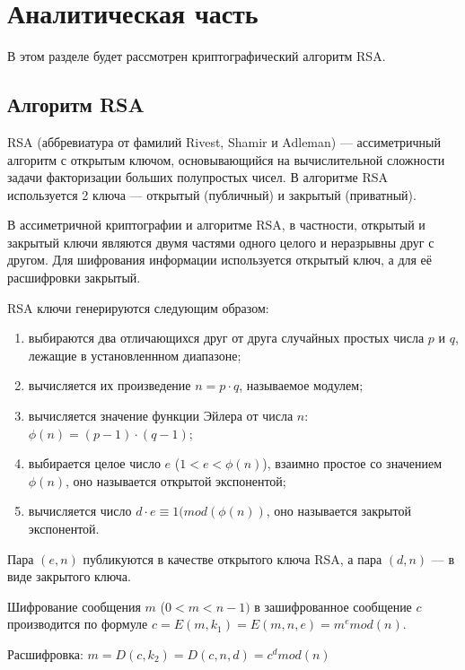 \chapter{Аналитическая часть}

В этом разделе будет рассмотрен криптографический алгоритм RSA.

\section{Алгоритм RSA}

RSA (аббревиатура от фамилий Rivest, Shamir и Adleman) --- ассиметричный алгоритм с открытым ключом, основывающийся на вычислительной сложности задачи факторизации больших полупростых чисел. В алгоритме RSA используется 2 ключа --- открытый (публичный) и закрытый (приватный).

В ассиметричной криптографии и алгоритме RSA, в частности, открытый и закрытый ключи являются двумя частями одного целого и неразрывны друг с другом. Для шифрования информации используется открытый ключ, а для её расшифровки закрытый.


RSA ключи генерируются следующим образом:
\begin{enumerate}[label=\arabic*)]
	\item выбираются два отличающихся друг от друга случайных простых числа $p$ и $q$, лежащие в установленнном диапазоне;
	\item вычисляется их произведение $n = p \cdot q$, называемое модулем;
	\item вычисляется значение функции Эйлера от числа $n$: $\phi(n) = (p - 1)\cdot (q - 1)$;
	\item выбирается целое число $e$ ($1 < e < \phi(n)$), взаимно простое со значением $\phi(n)$, оно называется открытой экспонентой;
	\item вычисляется число $d \cdot e  \equiv 1 (mod (\phi(n))$, оно называется закрытой экспонентой.
\end{enumerate}

Пара $(e, n)$ публикуются в качестве открытого ключа RSA, а пара $(d, n)$ --- в виде закрытого ключа.


Шифрование сообщения $m$ ($0 < m < n - 1)$ в зашифрованное сообщение $c$ производится по формуле $ c = E(m, k_1) = E(m, n, e) = m^{e} mod (n)$.

Расшифровка: $m = D(c, k_2) = D(c, n, d) = c^{d} mod (n)$
